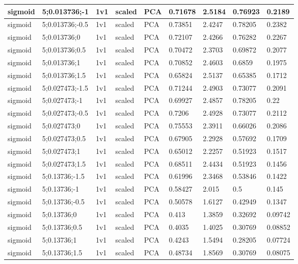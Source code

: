 \begin{longtable}{lllllllll}
sigmoid & 5;0.013736;-1 & 1v1 & scaled & PCA & 0.71678 & 2.5184 & 0.76923 & 0.2189\\ \hline
sigmoid & 5;0.013736;-0.5 & 1v1 & scaled & PCA & 0.73851 & 2.4247 & 0.78205 & 0.2382\\ \hline
sigmoid & 5;0.013736;0 & 1v1 & scaled & PCA & 0.72107 & 2.4266 & 0.76282 & 0.2267\\ \hline
sigmoid & 5;0.013736;0.5 & 1v1 & scaled & PCA & 0.70472 & 2.3703 & 0.69872 & 0.2077\\ \hline
sigmoid & 5;0.013736;1 & 1v1 & scaled & PCA & 0.70852 & 2.4603 & 0.6859 & 0.1975\\ \hline
sigmoid & 5;0.013736;1.5 & 1v1 & scaled & PCA & 0.65824 & 2.5137 & 0.65385 & 0.1712\\ \hline
sigmoid & 5;0.027473;-1.5 & 1v1 & scaled & PCA & 0.71244 & 2.4903 & 0.73077 & 0.2091\\ \hline
sigmoid & 5;0.027473;-1 & 1v1 & scaled & PCA & 0.69927 & 2.4857 & 0.78205 & 0.22\\ \hline
sigmoid & 5;0.027473;-0.5 & 1v1 & scaled & PCA & 0.7206 & 2.4928 & 0.73077 & 0.2112\\ \hline
sigmoid & 5;0.027473;0 & 1v1 & scaled & PCA & 0.75553 & 2.3911 & 0.66026 & 0.2086\\ \hline
sigmoid & 5;0.027473;0.5 & 1v1 & scaled & PCA & 0.67905 & 2.2928 & 0.57692 & 0.1709\\ \hline
sigmoid & 5;0.027473;1 & 1v1 & scaled & PCA & 0.65012 & 2.2257 & 0.51923 & 0.1517\\ \hline
sigmoid & 5;0.027473;1.5 & 1v1 & scaled & PCA & 0.68511 & 2.4434 & 0.51923 & 0.1456\\ \hline
sigmoid & 5;0.13736;-1.5 & 1v1 & scaled & PCA & 0.61996 & 2.3468 & 0.53846 & 0.1422\\ \hline
sigmoid & 5;0.13736;-1 & 1v1 & scaled & PCA & 0.58427 & 2.015 & 0.5 & 0.145\\ \hline
sigmoid & 5;0.13736;-0.5 & 1v1 & scaled & PCA & 0.50578 & 1.6127 & 0.42949 & 0.1347\\ \hline
sigmoid & 5;0.13736;0 & 1v1 & scaled & PCA & 0.413 & 1.3859 & 0.32692 & 0.09742\\ \hline
sigmoid & 5;0.13736;0.5 & 1v1 & scaled & PCA & 0.4035 & 1.4025 & 0.30769 & 0.08852\\ \hline
sigmoid & 5;0.13736;1 & 1v1 & scaled & PCA & 0.4243 & 1.5494 & 0.28205 & 0.07724\\ \hline
sigmoid & 5;0.13736;1.5 & 1v1 & scaled & PCA & 0.48734 & 1.8569 & 0.30769 & 0.08075\\ \hline

\end{longtable}
